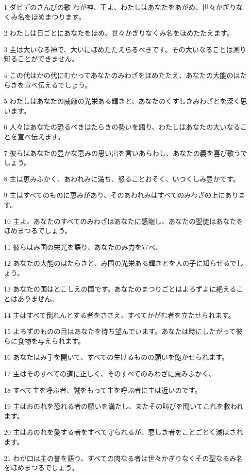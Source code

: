 \par 1 ダビデのさんびの歌 わが神、王よ、わたしはあなたをあがめ、世々かぎりなくみ名をほめまつります。
\par 2 わたしは日ごとにあなたをほめ、世々かぎりなくみ名をほめたたえます。
\par 3 主は大いなる神で、大いにほめたたえらるべきです。その大いなることは測り知ることができません。
\par 4 この代はかの代にむかってあなたのみわざをほめたたえ、あなたの大能のはたらきを宣べ伝えるでしょう。
\par 5 わたしはあなたの威厳の光栄ある輝きと、あなたのくすしきみわざとを深く思います。
\par 6 人々はあなたの恐るべきはたらきの勢いを語り、わたしはあなたの大いなることを宣べ伝えます。
\par 7 彼らはあなたの豊かな恵みの思い出を言いあらわし、あなたの義を喜び歌うでしょう。
\par 8 主は恵みふかく、あわれみに満ち、怒ることおそく、いつくしみ豊かです。
\par 9 主はすべてのものに恵みがあり、そのあわれみはすべてのみわざの上にあります。
\par 10 主よ、あなたのすべてのみわざはあなたに感謝し、あなたの聖徒はあなたをほめまつるでしょう。
\par 11 彼らはみ国の栄光を語り、あなたのみ力を宣べ、
\par 12 あなたの大能のはたらきと、み国の光栄ある輝きとを人の子に知らせるでしょう。
\par 13 あなたの国はとこしえの国です。あなたのまつりごとはよろずよに絶えることはありません。
\par 14 主はすべて倒れんとする者をささえ、すべてかがむ者を立たせられます。
\par 15 よろずのものの目はあなたを待ち望んでいます。あなたは時にしたがって彼らに食物を与えられます。
\par 16 あなたはみ手を開いて、すべての生けるものの願いを飽かせられます。
\par 17 主はそのすべての道に正しく、そのすべてのみわざに恵みふかく、
\par 18 すべて主を呼ぶ者、誠をもって主を呼ぶ者に主は近いのです。
\par 19 主はおのれを恐れる者の願いを満たし、またその叫びを聞いてこれを救われます。
\par 20 主はおのれを愛する者をすべて守られるが、悪しき者をことごとく滅ぼされます。
\par 21 わが口は主の誉を語り、すべての肉なる者は世々かぎりなくその聖なるみ名をほめまつるでしょう。

